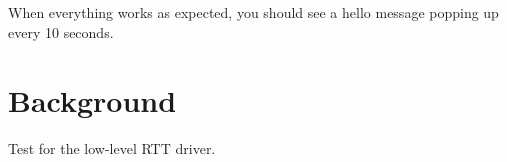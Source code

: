 When everything works as expected, you should see a hello message popping up every 10 seconds.

\section*{Background }

Test for the low-\/level R\+TT driver. 